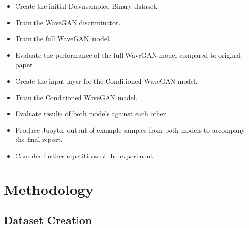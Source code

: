 \documentclass[a4paper, titlepage]{article}
\begin{document}
\begin{itemize}
\item Create the initial Downsampled Binary dataset.
\item Train the WaveGAN discriminator.
\item Train the full WaveGAN model.
\item Evaluate the performance of the full WaveGAN model compared to original paper.
\item Create the input layer for the Conditioned WaveGAN model.
\item Train the Conditioned WaveGAN model.
\item Evaluate results of both models against each other.
\item Produce Jupyter output of example samples from both models to accompany the final report.
\item Consider further repetitions of the experiment.
\end{itemize}

\newpage

\section{Methodology}

\subsection{Dataset Creation}
\end{document}
